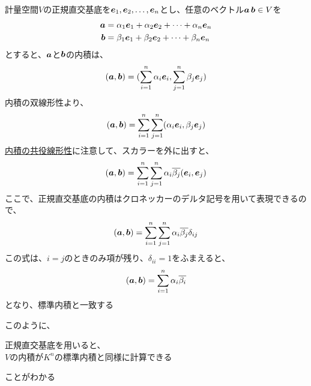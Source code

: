 \documentclass[../../../topic_linear-algebra]{subfiles}
\begin{document}
\br

計量空間$V$の正規直交基底を$\vb*{e}_1, \vb*{e}_2, \ldots, \vb*{e}_n$とし、任意のベクトル$\vb*{a}\,\vb*{b} \in V$を
\begin{align*}
  \vb*{a} & = \alpha_1 \vb*{e}_1 + \alpha_2 \vb*{e}_2 + \cdots + \alpha_n \vb*{e}_n \\
  \vb*{b} & = \beta_1 \vb*{e}_1 + \beta_2 \vb*{e}_2 + \cdots + \beta_n \vb*{e}_n
\end{align*}
とすると、$\vb*{a}$と$\vb*{b}$の内積は、
\begin{equation*}
  (\vb*{a},\vb*{b}) = (\sum_{i=1}^n \alpha_i \vb*{e}_i, \sum_{j=1}^n \beta_j \vb*{e}_j)
\end{equation*}
内積の双線形性より、
\begin{equation*}
  (\vb*{a},\vb*{b}) = \sum_{i=1}^n \sum_{j=1}^n (\alpha_i \vb*{e}_i, \beta_j \vb*{e}_j)
\end{equation*}
\hyperref[thm:conjugate-linearity-of-inner-product]{内積の共役線形性}に注意して、スカラーを外に出すと、
\begin{equation*}
  (\vb*{a},\vb*{b}) = \sum_{i=1}^n \sum_{j=1}^n \alpha_i \overline{\beta_j} (\vb*{e}_i, \vb*{e}_j)
\end{equation*}
ここで、正規直交基底の内積はクロネッカーのデルタ記号を用いて表現できるので、
\begin{equation*}
  (\vb*{a},\vb*{b}) = \sum_{i=1}^n \sum_{j=1}^n \alpha_i \overline{\beta_j} \delta_{ij}
\end{equation*}
この式は、$i=j$のときのみ項が残り、$\delta_{ii} = 1$をふまえると、
\begin{equation*}
  (\vb*{a},\vb*{b}) = \sum_{i=1}^n \alpha_i \overline{\beta_i}
\end{equation*}
となり、標準内積と一致する

\br

このように、
\begin{shaded}
  正規直交基底を用いると、\\
  $V$の内積が$K^n$の標準内積と同様に計算できる
\end{shaded}
ことがわかる
\end{document}
